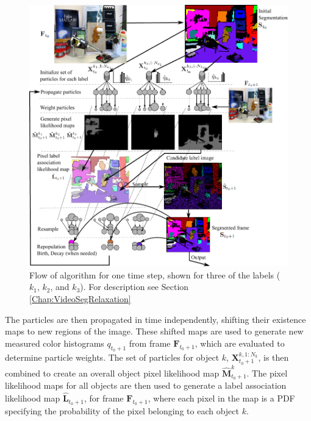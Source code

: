 \begin{figure}
\includegraphics[width=\linewidth]{figures/ECCV2012/AlgorithmFlow2.pdf}
  \caption[Overview of Algorithm]{Flow of algorithm for one time step, shown for three of the labels ($k_1$, $k_2$, and $k_3$). For description see Section \ref{Chap:VideoSegRelaxation}}
\label{fig:AlgorithmOverview}
\end{figure}

The particles are then propagated in time independently, shifting their existence maps to new regions of the image. These shifted maps are used to generate new measured color histograms $q_{t_0+1}$ from frame $\mathbf{F}_{t_0+1}$, which are evaluated to determine particle weights. The set of particles for object $k$, $\mathbf{X}^{k,1:N_k}_{t_0+1}$, is then combined to create an overall object pixel likelihood map $\mathbf{\hat{M}}^k_{t_0+1}$. The pixel likelihood maps for all objects are then used to generate a label association likelihood map $\mathbf{\hat{L}}_{t_0+1}$, for frame $\mathbf{F}_{t_0+1}$, where each pixel in the map is a PDF specifying the probability of the pixel belonging to each object $k$.




